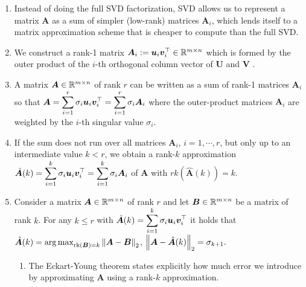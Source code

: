 \begin{enumerate}
    \item Instead of doing the full SVD factorization, SVD allows us to represent a matrix $\bm{A}$ as a sum of simpler (low-rank) matrices $\bm{A}_i$, which lends itself to a matrix approximation scheme that is cheaper to compute than the full SVD.
    \hfill \cite{mfml/book/mml/Deisenroth-Faisal-Ong}

    \item We construct a rank-1 matrix
    $
        \bm{A}_i
        := \bm{u}_i \bm{v}_i^\top
        \in \mathbb{R}^{m\times n}
    $
    which is formed by the outer product of the $i$-th orthogonal column vector of $\bm{U}$ and $\bm{V}$ .
    \hfill \cite{mfml/book/mml/Deisenroth-Faisal-Ong}

    \item A matrix $\bm{A} \in \mathbb{R}^{m\times n}$ of rank $r$ can be written as a sum of rank-1 matrices $\bm{A}_i$ so that
    $
        \bm{A}
        = \displaystyle\sum_{i=1}^r \sigma_i \bm{u}_i \bm{v}_i^\top
        = \displaystyle\sum_{i=1}^r \sigma_i \bm{A}_i
    $
    where the outer-product matrices $\bm{A}_i$ are weighted by the $i$-th singular value $\sigma_i$.
    \hfill \cite{mfml/book/mml/Deisenroth-Faisal-Ong}

    \item If the sum does not run over all matrices $\bm{A}_i$, $i = 1, \cdots , r$, but only up to an intermediate value $k < r$, we obtain a rank-$k$ approximation
    $
        \hat{\bm{A}}(k)
        = \displaystyle\sum_{i=1}^k \sigma_i \bm{u}_i \bm{v}_i^\top
        = \displaystyle\sum_{i=1}^k \sigma_i \bm{A}_i
    $
    of $\bm{A}$ with $rk(\hat{\bm{A}}(k)) = k$.
    \hfill \cite{mfml/book/mml/Deisenroth-Faisal-Ong}

    \item \begin{theorem}
        Consider a matrix $\bm{A} \in \mathbb{R}^{m\times n}$ of rank $r$ and let $\bm{B} \in \mathbb{R}^{m\times n}$ be a matrix of rank $k$.
        For any $k \leq r$ with $\hat{\bm{A}}(k) = \displaystyle\sum^k_{i=1} \sigma_i \bm{u}_i \bm{v}_i^\top$ it holds that
        ${
            \displaystyle
            \hat{\bm{A}}(k)
            = {\arg\max}_{\text{rk}(\bm{B})=k} \left\| \bm{A} - \bm{B} \right\|_2
        }$,
        \hspace{0.5cm}
        ${
            \displaystyle
            \left\| \bm{A} - \hat{\bm{A}}(k) \right\|_2 = \sigma_{k+1}.
        }$
        \hfill \cite{mfml/book/mml/Deisenroth-Faisal-Ong}
    \end{theorem}
    \begin{enumerate}
        \item The Eckart-Young theorem states explicitly how much error we introduce by approximating $\bm{A}$ using a rank-$k$ approximation.
        \hfill \cite{mfml/book/mml/Deisenroth-Faisal-Ong}


\end{enumerate}
\end{enumerate}
